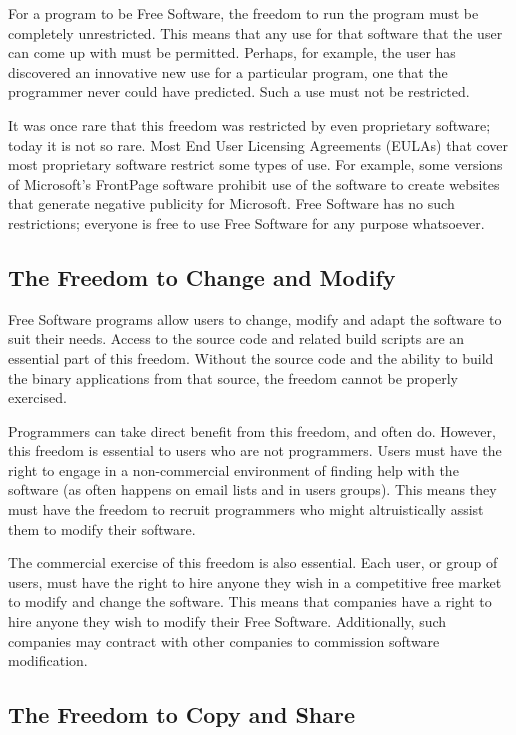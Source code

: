 \documentclass[12pt]{report}
\begin{document}
For a program to be Free Software, the freedom to run the program must be
completely unrestricted.  This means that any use for that software that
the user can come up with must be permitted.  Perhaps, for example, the
user has discovered an innovative new use for a particular program, one
that the programmer never could have predicted.  Such a use must not be
restricted.

It was once rare that this freedom was restricted by even proprietary
software; today it is not so rare.  Most End User Licensing Agreements
(EULAs) that cover most proprietary software restrict some types of use.
For example, some versions of Microsoft's FrontPage software prohibit use
of the software to create websites that generate negative publicity for
Microsoft.  Free Software has no such restrictions; everyone is free to
use Free Software for any purpose whatsoever.

\subsection{The Freedom to Change and Modify}

Free Software programs allow users to change, modify and adapt the
software to suit their needs.  Access to the source code and related build
scripts are an essential part of this freedom.  Without the source code
and the ability to build the binary applications from that source, the
freedom cannot be properly exercised.

Programmers can take direct benefit from this freedom, and often do.
However, this freedom is essential to users who are not programmers.
Users must have the right to engage in a non-commercial environment of
finding help with the software (as often happens on email lists and in
users groups).  This means they must have the freedom to recruit
programmers who might altruistically assist them to modify their software.

The commercial exercise of this freedom is also essential.  Each user, or
group of users, must have the right to hire anyone they wish in a
competitive free market to modify and change the software.  This means
that companies have a right to hire anyone they wish to modify their Free
Software.  Additionally, such companies may contract with other companies
to commission software modification.

\subsection{The Freedom to Copy and Share}
\end{document}
